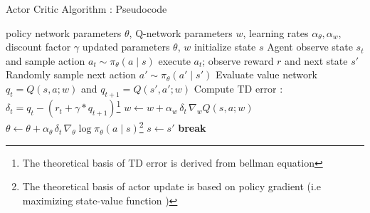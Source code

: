 \documentclass{beamer}
\begin{document}
    \begin{frame}[fragile]{Actor Critic Algorithm : Pseudocode}
      \begin{tcolorbox}
    
        \scriptsize  %
    
        \begin{algorithmic}[1]
          \Require policy network parameters $\theta$, Q-network parameters $w$, learning rates $\alpha_\theta,\alpha_w$, discount factor $\gamma$
          \Ensure updated parameters $\theta$, $w$
            \State initialize state $s$
              \State Agent observe state $s_t$ and sample action $a_t \sim \pi_\theta(a \mid s)$
              \State execute $a_t$; observe reward $r$ and next state $s'$
              \State Randomly sample next action $a' \sim \pi_\theta(a' \mid s')$
              \State Evaluate value network $q_t = Q(s,a;w)$ and $q_{t+1} = Q(s',a';w)$
              \State Compute TD error : $\delta_t = q_t-(r_t+\gamma *q_{t+1})$\footnote{The theoretical basis of TD error is derived from bellman equation}
              \State $w \gets w + \alpha_w\,\delta_t\,\nabla_w Q(s,a;w)$  
              \State $\theta \gets \theta + \alpha_\theta\,\delta_t\,\nabla_\theta \log \pi_\theta(a \mid s)$\footnote{{The theoretical basis of actor update is based on policy gradient (i.e maximizing state-value function )}} 
              \State $s \gets s'$
                \State \textbf{break}
              \EndIf
            \EndFor
          \EndFor
        \end{algorithmic}
    
      \end{tcolorbox}
    \end{frame}
\end{document}
